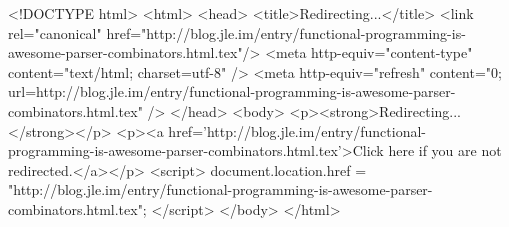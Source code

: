 <!DOCTYPE html>
<html>
<head>
<title>Redirecting...</title>
<link rel="canonical" href="http://blog.jle.im/entry/functional-programming-is-awesome-parser-combinators.html.tex"/>
<meta http-equiv="content-type" content="text/html; charset=utf-8" />
<meta http-equiv="refresh" content="0; url=http://blog.jle.im/entry/functional-programming-is-awesome-parser-combinators.html.tex" />
</head>
<body>
  <p><strong>Redirecting...</strong></p>
  <p><a href='http://blog.jle.im/entry/functional-programming-is-awesome-parser-combinators.html.tex'>Click here if you are not redirected.</a></p>
  <script>
    document.location.href = "http://blog.jle.im/entry/functional-programming-is-awesome-parser-combinators.html.tex";
  </script>
</body>
</html>
